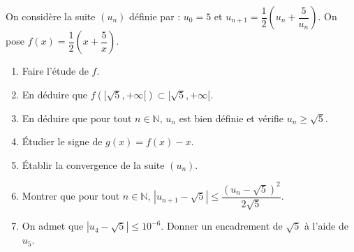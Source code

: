 \documentclass[solutions]{exercices}
\begin{document}
\begin{exercice}[\di]
On considère la suite $(u_n)$ définie par : $u_0=5$ et $u_{n+1}=\dfrac{1}{2}\left(u_n+\dfrac{5}{u_n}\right)$.
On pose $f(x)=\dfrac{1}{2}\left(x+\dfrac{5}x\right)$.
\begin{enumerate}
 \item Faire l'étude de $f$.
 \item En déduire que $f([\sqrt{5},+\infty[)\subset[\sqrt{5},+\infty[$.
 \item En déduire que pour tout $n\in\mathbb{N}$, $u_n$ est bien définie et vérifie $u_n\ge \sqrt{5}$.
 \item Étudier le signe de $g(x)=f(x)-x$.
 \item Établir la convergence de la suite $(u_n)$.
 \item Montrer que pour tout $n\in\mathbb{N}$, $|u_{n+1}-\sqrt{5}|\le\dfrac{(u_n-\sqrt5)^2}{2\sqrt{5}}$.
\item On admet que $|u_4-\sqrt{5}|\le 10^{-6}$. Donner un encadrement de $\sqrt{5}$ à l'aide de $u_5$.
\end{enumerate}
\end{exercice}
\end{document}
